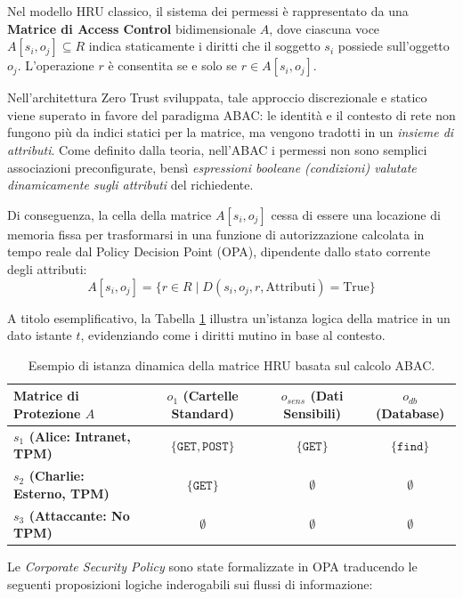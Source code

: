 Nel modello HRU classico, il sistema dei permessi è rappresentato da una \textbf{Matrice di Access Control} bidimensionale $A$, dove ciascuna voce $A[s_i, o_j] \subseteq R$ indica staticamente i diritti che il soggetto $s_i$ possiede sull'oggetto $o_j$. L'operazione $r$ è consentita se e solo se $r \in A[s_i, o_j]$. 

Nell'architettura Zero Trust sviluppata, tale approccio discrezionale e statico viene superato in favore del paradigma ABAC: le identità e il contesto di rete non fungono più da indici statici per la matrice, ma vengono tradotti in un \textit{insieme di attributi}. Come definito dalla teoria, nell'ABAC i permessi non sono semplici associazioni preconfigurate, bensì \textit{espressioni booleane (condizioni) valutate dinamicamente sugli attributi} del richiedente.

Di conseguenza, la cella della matrice $A[s_i, o_j]$ cessa di essere una locazione di memoria fissa per trasformarsi in una funzione di autorizzazione calcolata in tempo reale dal Policy Decision Point (OPA), dipendente dallo stato corrente degli attributi:
$$ A[s_i, o_j] = \{ r \in R \mid D(s_i, o_j, r, \text{Attributi}) = \text{True} \} $$

A titolo esemplificativo, la Tabella \ref{tab:matrice_hru} illustra un'istanza logica della matrice in un dato istante $t$, evidenziando come i diritti mutino in base al contesto.

\begin{table}[H]
\centering
\renewcommand{\arraystretch}{1.5}
\begin{tabular}{|l|c|c|c|}
\hline
\textbf{Matrice di Protezione $A$} & \textbf{$o_1$ (Cartelle Standard)} & \textbf{$o_{sens}$ (Dati Sensibili)} & \textbf{$o_{db}$ (Database)} \\ \hline
\textbf{$s_1$ (Alice: Intranet, TPM)} & $\{\texttt{GET}, \texttt{POST}\}$ & $\{\texttt{GET}\}$ & $\{\texttt{find}\}$ \\ \hline
\textbf{$s_2$ (Charlie: Esterno, TPM)} & $\{\texttt{GET}\}$ & $\emptyset$ & $\emptyset$ \\ \hline
\textbf{$s_3$ (Attaccante: No TPM)} & $\emptyset$ & $\emptyset$ & $\emptyset$ \\ \hline
\end{tabular}
\caption{Esempio di istanza dinamica della matrice HRU basata sul calcolo ABAC.}\label{tab:matrice_hru}
\end{table}

Le \textit{Corporate Security Policy} sono state formalizzate in OPA traducendo le seguenti proposizioni logiche inderogabili sui flussi di informazione:

